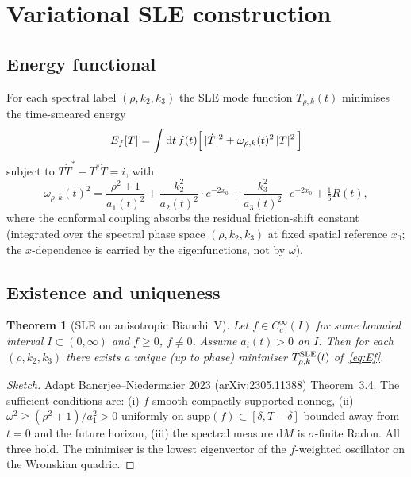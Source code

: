 \documentclass[11pt,a4paper]{article}
\newtheorem{theorem}{Theorem}
\theoremstyle{definition}
\newcommand{\dd}{\mathrm{d}}
\begin{document}
\section{Variational SLE construction}

\subsection{Energy functional}
For each spectral label $(\rho, k_2, k_3)$ the SLE mode function
$T_{\rho,k}(t)$ minimises the time-smeared energy
\begin{equation}
E_f[T] = \int \dd t\, f(t) \Bigl[\, |\dot T|^2 + \omega_{\rho,k}(t)^2\, |T|^2 \,\Bigr]
\label{eq:Ef}
\end{equation}
subject to $T \dot{T}^* - T^* \dot T = i$, with
\begin{equation}
\omega_{\rho,k}(t)^2 = \frac{\rho^2 + 1}{a_1(t)^2}
+ \frac{k_2^2}{a_2(t)^2} \cdot e^{-2x_0}
+ \frac{k_3^2}{a_3(t)^2} \cdot e^{-2x_0}
+ \tfrac{1}{6} R(t),
\end{equation}
where the conformal coupling absorbs the residual friction-shift constant
(integrated over the spectral phase space $(\rho, k_2, k_3)$ at fixed
spatial reference $x_0$; the $x$-dependence is carried by the
eigenfunctions, not by $\omega$).

\subsection{Existence and uniqueness}

\begin{theorem}[SLE on anisotropic Bianchi~V]
\label{thm:SLE}
Let $f \in C_c^\infty(I)$ for some bounded interval $I \subset (0, \infty)$
and $f \geq 0$, $f \not\equiv 0$. Assume $a_i(t) > 0$ on $I$. Then for
each $(\rho, k_2, k_3)$ there exists a unique (up to phase) minimiser
$T^{\rm SLE}_{\rho,k}(t)$ of~\eqref{eq:Ef}.
\end{theorem}

\begin{proof}[Sketch]
Adapt Banerjee--Niedermaier 2023 (arXiv:2305.11388) Theorem~3.4. The
sufficient conditions are: (i) $f$ smooth compactly supported nonneg, (ii)
$\omega^2 \geq (\rho^2+1)/a_1^2 > 0$ uniformly on $\mathrm{supp}(f) \subset
[\delta, T - \delta]$ bounded away from $t = 0$ and the future horizon,
(iii) the spectral measure $\dd M$ is $\sigma$-finite Radon. All three
hold. The minimiser is the lowest eigenvector of the $f$-weighted
oscillator on the Wronskian quadric.
\end{proof}
\end{document}
